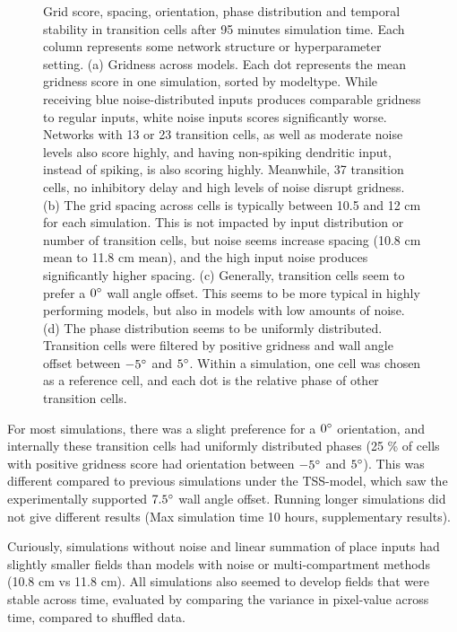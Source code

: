 \documentclass{article}
\begin{document}
\begin{figure}[htbp]
        \caption{Grid score, spacing, orientation, phase distribution and temporal stability in transition cells after 95 minutes simulation time. Each column represents some network structure or hyperparameter setting. (a) Gridness across models. Each dot represents the mean gridness score in one simulation, sorted by modeltype. While receiving blue noise-distributed inputs produces comparable gridness to regular inputs, white noise inputs scores significantly worse. Networks with 13 or 23 transition cells, as well as moderate noise levels also score highly, and having non-spiking dendritic input, instead of spiking, is also scoring highly. Meanwhile, 37 transition cells, no inhibitory delay and high levels of noise disrupt gridness. (b) The grid spacing across cells is typically between 10.5 and 12 cm for each simulation. This is not impacted by input distribution or number of transition cells, but noise seems increase spacing (10.8 cm mean to 11.8 cm mean), and the high input noise produces significantly higher spacing. (c) Generally, transition cells seem to prefer a \(0\degree\) wall angle offset. This seems to be more typical in highly performing models, but also in models with low amounts of noise. (d) The phase distribution seems to be uniformly distributed. Transition cells were filtered by positive gridness and wall angle offset between \(-5\degree\) and \(5\degree\). Within a simulation, one cell was chosen as a reference cell, and each dot is the relative phase of other transition cells.}
        
        \label{model_comparison}
    \end{figure}

    For most simulations, there was a slight preference for a \(0\degree\) orientation, and internally these transition cells had uniformly distributed phases (25 \% of cells with positive gridness score had orientation between \(-5\degree\) and \(5 \degree\)). This was different compared to previous simulations under the TSS-model, which saw the experimentally supported \(7.5\degree\) wall angle offset. Running longer simulations did not give different results (Max simulation time 10 hours, supplementary results). 

    Curiously, simulations without noise and linear summation of place inputs had slightly smaller fields than models with noise or multi-compartment methods (10.8 cm vs 11.8 cm). All simulations also seemed to develop fields that were stable across time, evaluated by comparing the variance in pixel-value across time, compared to shuffled data.
\end{document}
